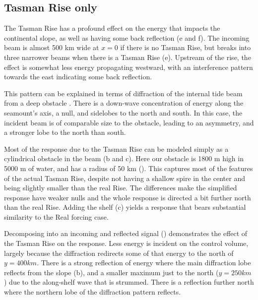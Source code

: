 \documentclass[10pt]{article}
\newcommand{\tempS}[1]{}
\newcommand{\mn}[1]{{\sc #1}}
\begin{document}
\subsection{Tasman Rise only}

The Tasman Rise has a profound effect on the energy that impacts the continental slope, as well as having some back reflection (e and f).  The incoming beam is almost 500 km wide at $x=0$ if there is no Tasman Rise, but breaks into three narrower beams when there is a Tasman Rise (e).  Upstream of the rise, the effect is somewhat less energy propagating westward, with an  interference pattern towards the east indicating some back reflection.  



This pattern can be explained in terms of diffraction of the internal tide beam from a deep obstacle \citep[i.e.][]{johnstonetal03}.  There is a down-wave concentration of energy along the seamount's axis, a null, and sidelobes to the north and south.  In this case, the incident beam is of comparable size to the obstacle, leading to an asymmetry, and a stronger lobe to the north than south.  

Most of the response due to the Tasman Rise can be modeled simply as a cylindrical obstacle in the beam (b and c).  Here our obstacle is 1800 m high in 5000 m of water, and has a radius of 50 km ().  This captures most of the features of the actual Tasman Rise, despite not having a shallow spire in the center and being slightly smaller than the real Rise.  The differences make the simplified response have weaker nulls and the whole response is directed a bit further north than the real Rise.  Adding the shelf (c) yields a response that bears substantial similarity to the \mn{Real} forcing case.  

Decomposing into an incoming and reflected signal () demonstrates the effect of the Tasman Rise on the response.  Less energy is incident on the control volume, largely because the diffraction redirects some of that energy to the north of $y=400 km$.  There is a strong reflection of energy where the main diffraction lobe reflects from the slope (b), and a smaller maximum just to the north ($y=250 km$) due to the along-shelf wave that is strummed.  There is a reflection further north where the northern lobe of the diffraction pattern reflects.  
\end{document}
